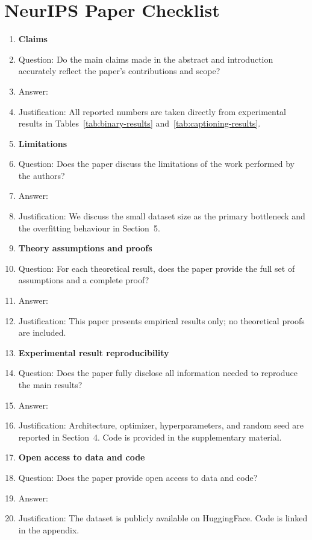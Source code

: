 \documentclass{article}
\begin{document}
{\section*{NeurIPS Paper Checklist}

\begin{enumerate}

\item {\bf Claims}
    \item[] Question: Do the main claims made in the abstract and introduction accurately reflect the paper's contributions and scope?
    \item[] Answer: \answerYes{}
    \item[] Justification: All reported numbers are taken directly from experimental results in Tables~\ref{tab:binary-results} and~\ref{tab:captioning-results}.

\item {\bf Limitations}
    \item[] Question: Does the paper discuss the limitations of the work performed by the authors?
    \item[] Answer: \answerYes{}
    \item[] Justification: We discuss the small dataset size as the primary bottleneck and the overfitting behaviour in Section~5.

\item {\bf Theory assumptions and proofs}
    \item[] Question: For each theoretical result, does the paper provide the full set of assumptions and a complete proof?
    \item[] Answer: \answerNA{}
    \item[] Justification: This paper presents empirical results only; no theoretical proofs are included.

\item {\bf Experimental result reproducibility}
    \item[] Question: Does the paper fully disclose all information needed to reproduce the main results?
    \item[] Answer: \answerYes{}
    \item[] Justification: Architecture, optimizer, hyperparameters, and random seed are reported in Section~4. Code is provided in the supplementary material.

\item {\bf Open access to data and code}
    \item[] Question: Does the paper provide open access to data and code?
    \item[] Answer: \answerYes{}
    \item[] Justification: The dataset is publicly available on HuggingFace. Code is linked in the appendix.


\end{enumerate}}
\end{document}
